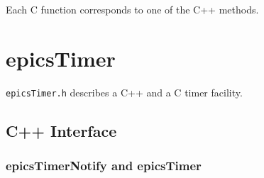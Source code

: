 Each C function corresponds to one of the C++ methods.

\section{epicsTimer}

\verb|epicsTimer.h| describes a C++ and a C timer facility.

\subsection{C++ Interface}

\subsubsection{epicsTimerNotify and epicsTimer}


